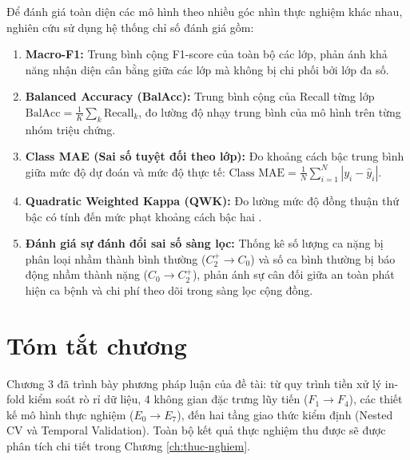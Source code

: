 Để đánh giá toàn diện các mô hình theo nhiều góc nhìn thực nghiệm khác nhau, nghiên cứu sử dụng hệ thống chỉ số đánh giá gồm:
\begin{enumerate}
    \item \textbf{Macro-F1:} Trung bình cộng F1-score của toàn bộ các lớp, phản ánh khả năng nhận diện cân bằng giữa các lớp mà không bị chi phối bởi lớp đa số.
    \item \textbf{Balanced Accuracy (BalAcc):} Trung bình cộng của Recall từng lớp $\text{BalAcc} = \frac{1}{K}\sum_k \text{Recall}_k$, đo lường độ nhạy trung bình của mô hình trên từng nhóm triệu chứng.
    \item \textbf{Class MAE (Sai số tuyệt đối theo lớp):} Đo khoảng cách bậc trung bình giữa mức độ dự đoán và mức độ thực tế: $\text{Class MAE} = \frac{1}{N} \sum_{i=1}^N |y_i - \hat{y}_i|$.
    \item \textbf{Quadratic Weighted Kappa (QWK):} Đo lường mức độ đồng thuận thứ bậc có tính đến mức phạt khoảng cách bậc hai \cite{cohen1968weighted}.
    \item \textbf{Đánh giá sự đánh đổi sai số sàng lọc:} Thống kê số lượng ca nặng bị phân loại nhầm thành bình thường ($C_2^+ \to C_0$) và số ca bình thường bị báo động nhầm thành nặng ($C_0 \to C_2^+$), phản ánh sự cân đối giữa an toàn phát hiện ca bệnh và chi phí theo dõi trong sàng lọc cộng đồng.
\end{enumerate}

\section{Tóm tắt chương}
\label{sec:tom-tat-chuong-3}

Chương 3 đã trình bày phương pháp luận của đề tài: từ quy trình tiền xử lý in-fold kiểm soát rò rỉ dữ liệu, 4 không gian đặc trưng lũy tiến ($F_1 \to F_4$), các thiết kế mô hình thực nghiệm ($E_0 \to E_7$), đến hai tầng giao thức kiểm định (Nested CV và Temporal Validation). Toàn bộ kết quả thực nghiệm thu được sẽ được phân tích chi tiết trong Chương \ref{ch:thuc-nghiem}.
